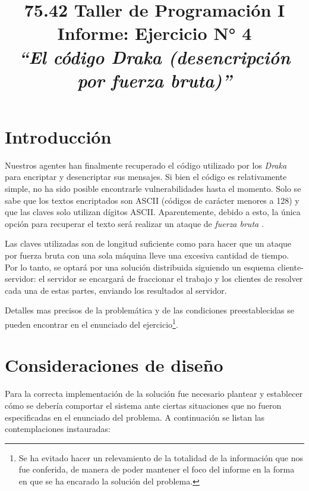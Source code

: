 \documentclass{article}
\begin{document}
\title{\Large 75.42 Taller de Programación I \\ 
	  \medskip\Huge Informe: Ejercicio N° 4  \\
	  \bigskip\Large\textit{``El código Draka (desencripción por fuerza bruta)''}}
\date{}
\maketitle




\section{Introducción}
	
	Nuestros agentes han finalmente recuperado el código utilizado por los \textit{Draka} para encriptar y desencriptar sus mensajes. Si bien el código es relativamente simple, no ha sido posible encontrarle vulnerabilidades hasta el momento. Solo se sabe que los textos encriptados son ASCII \cite{ASCII} (códigos de carácter menores a 128) y que las claves solo utilizan dígitos ASCII. Aparentemente, debido a esto, la única opción para recuperar el texto será realizar un ataque de \textit{fuerza bruta} \cite{FB}.
	\par
	Las claves utilizadas son de longitud suficiente como para hacer que un ataque por fuerza bruta con una sola máquina lleve una excesiva cantidad de tiempo. Por lo tanto, se optará por una solución distribuida siguiendo un esquema cliente-servidor: el servidor se encargará de fraccionar el trabajo y los clientes de resolver cada una de estas partes, enviando los resultados al servidor.
	\par
	Detalles mas precisos de la problemática y de las condiciones preestablecidas se pueden encontrar en el enunciado del ejercicio\footnote{Se ha evitado hacer un relevamiento de la totalidad de la información que nos fue conferida, de manera de poder mantener el foco del informe en la forma en que se ha encarado la solución del problema.}.
\bigskip




\section{Consideraciones de diseño}

	Para la correcta implementación de la solución fue necesario plantear y establecer cómo se debería comportar el sistema ante ciertas situaciones que no fueron especificadas en el enunciado del problema. A continuación se listan las contemplaciones instauradas:
\end{document}
